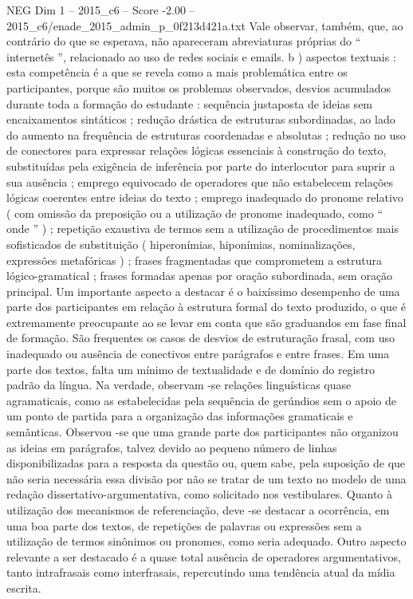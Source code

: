\begin{textsample}{NEG Dim 1 – 2015\_c6 – Score -2.00 – 2015\_c6/enade\_2015\_admin\_p\_0f213d421a.txt}
Vale observar, também, que, ao contrário do que se esperava, não apareceram abreviaturas próprias do “ internetês ”, relacionado ao uso de redes sociais e emails. b ) aspectos textuais : esta competência é a que se revela como a mais problemática entre os participantes, porque são muitos os problemas observados, desvios acumulados durante toda a formação do estudante : sequência justaposta de ideias sem encaixamentos sintáticos ; redução drástica de estruturas subordinadas, ao lado do aumento na frequência de estruturas coordenadas e absolutas ; redução no uso de conectores para expressar relações lógicas essenciais à construção do texto, substituídas pela exigência de inferência por parte do interlocutor para suprir a sua ausência ; emprego equivocado de operadores que não estabelecem relações lógicas coerentes entre ideias do texto ; emprego inadequado do pronome relativo ( com omissão da preposição ou a utilização de pronome inadequado, como “ onde ” ) ; repetição exaustiva de termos sem a utilização de procedimentos mais sofisticados de substituição ( hiperonímias, hiponímias, nominalizações, expressões metafóricas ) ; frases fragmentadas que comprometem a estrutura lógico-gramatical ; frases formadas apenas por oração subordinada, sem oração principal.
Um importante aspecto a destacar é o baixíssimo desempenho de uma parte dos participantes em relação à estrutura formal do texto produzido, o que é extremamente preocupante ao se levar em conta que são graduandos em fase final de formação.
São frequentes os casos de desvios de estruturação frasal, com uso inadequado ou ausência de conectivos entre parágrafos e entre frases.
Em uma parte dos textos, falta um mínimo de textualidade e de domínio do registro padrão da língua.
Na verdade, observam -se relações linguísticas quase agramaticais, como as estabelecidas pela sequência de gerúndios sem o apoio de um ponto de partida para a organização das informações gramaticais e semânticas.
Observou -se que uma grande parte dos participantes não organizou as ideias em parágrafos, talvez devido ao pequeno número de linhas disponibilizadas para a resposta da questão ou, quem sabe, pela suposição de que não seria necessária essa divisão por não se tratar de um texto no modelo de uma redação dissertativo-argumentativa, como solicitado nos vestibulares.
Quanto à utilização dos mecanismos de referenciação, deve -se destacar a ocorrência, em uma boa parte dos textos, de repetições de palavras ou expressões sem a utilização de termos sinônimos ou pronomes, como seria adequado.
Outro aspecto relevante a ser destacado é a quase total ausência de operadores argumentativos, tanto intrafrasais como interfrasais, repercutindo uma tendência atual da mídia escrita.

\end{textsample}
